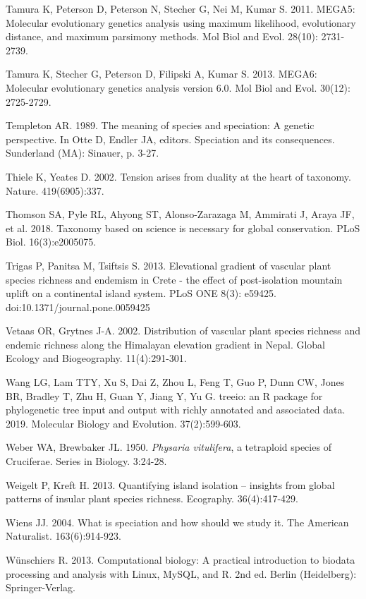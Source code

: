 Tamura K, Peterson D, Peterson N, Stecher G, Nei M, Kumar S. 2011. MEGA5: Molecular evolutionary genetics analysis using maximum likelihood, evolutionary distance, and maximum parsimony methods. Mol Biol and Evol. 28(10): 2731-2739.

Tamura K, Stecher G, Peterson D, Filipski A, Kumar S. 2013. MEGA6: Molecular evolutionary genetics analysis version 6.0. Mol Biol and Evol. 30(12): 2725-2729.

Templeton AR. 1989. The meaning of species and speciation: A genetic perspective. In Otte D, Endler JA, editors. Speciation and its consequences. Sunderland (MA): Sinauer, p. 3-27.

Thiele K, Yeates D. 2002. Tension arises from duality at the heart of taxonomy. Nature. 419(6905):337.

Thomson SA, Pyle RL, Ahyong ST, Alonso-Zarazaga M, Ammirati J, Araya JF, et al. 2018. Taxonomy based on science is necessary for global conservation. PLoS Biol. 16(3):e2005075.

Trigas P, Panitsa M, Tsiftsis S. 2013. Elevational gradient of vascular plant species richness and endemism in Crete - the effect of post-isolation mountain uplift on a continental island system. PLoS ONE 8(3): e59425. doi:10.1371/journal.pone.0059425

Vetaas OR, Grytnes J-A. 2002. Distribution of vascular plant species richness and endemic richness along the Himalayan elevation gradient in Nepal. Global Ecology and Biogeography. 11(4):291-301.

Wang LG, Lam TTY, Xu S, Dai Z, Zhou L, Feng T, Guo P, Dunn CW, Jones BR, Bradley T, Zhu H, Guan Y, Jiang Y, Yu G. treeio: an R package for phylogenetic tree input and output with richly annotated and associated data. 2019. Molecular Biology and Evolution. 37(2):599-603.

Weber WA, Brewbaker JL. 1950. \textit{Physaria vitulifera}, a tetraploid species of Cruciferae. Series in Biology. 3:24-28.

Weigelt P, Kreft H. 2013. Quantifying island isolation – insights from global patterns of insular plant species richness. Ecography. 36(4):417-429.


Wiens JJ. 2004. What is speciation and how should we study it. The American Naturalist. 163(6):914-923.

Wünschiers R. 2013. Computational biology: A practical introduction to biodata processing and analysis with Linux, MySQL, and R. 2nd ed. Berlin (Heidelberg): Springer-Verlag.

